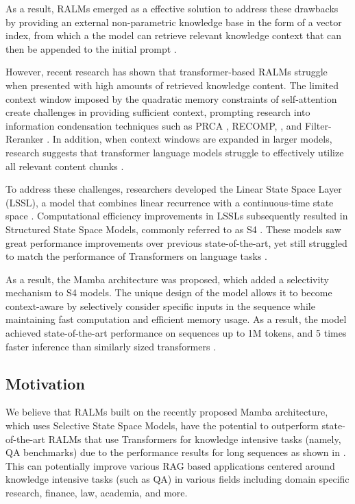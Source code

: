 \documentclass[11pt]{article}
\begin{document}
As a result, RALMs emerged as a effective solution to address these drawbacks by providing an external non-parametric knowledge base in the form of a vector index, from which a the model can retrieve relevant knowledge context that can then be appended to the initial prompt \cite{lewis2021retrievalaugmented}.

However, recent research has shown that transformer-based RALMs struggle when presented with high amounts of retrieved knowledge content. The limited context window imposed by the quadratic memory constraints of self-attention create challenges in providing sufficient context, prompting research into information condensation techniques such as PRCA \cite{yang-etal-2023-prca}, RECOMP, \cite{xu2023recomp}, and Filter-Reranker \cite {ma2023large}. In addition, when context windows are expanded in larger models, research suggests that transformer language models struggle to effectively utilize all relevant content chunks \cite{xu2024retrieval, liu2023lost}. 

To address these challenges, researchers developed the Linear State Space Layer (LSSL), a model that combines linear recurrence with a continuous-time state space \cite{gu2021combining}. Computational efficiency improvements in LSSLs subsequently resulted in Structured State Space Models, commonly referred to as S4 \cite{gu2022}. These models saw great performance improvements over previous state-of-the-art, yet still struggled to match the performance of Transformers on language tasks \cite{gu2023mamba}.

As a result, the Mamba architecture was proposed, which added a selectivity mechanism to S4 models. The unique design of the model allows it to become context-aware by selectively consider specific inputs in the sequence while maintaining fast computation and efficient memory usage. As a result, the model achieved state-of-the-art performance on sequences up to 1M tokens, and 5 times faster inference than similarly sized transformers \cite{gu2023mamba}. 

\subsection{Motivation}
We believe that RALMs built on the recently proposed Mamba architecture, which uses Selective State Space Models, have the potential to outperform state-of-the-art RALMs that use Transformers for knowledge intensive tasks (namely, QA benchmarks) due to the performance results for long sequences as shown in \cite{gu2023mamba, gu2022}. This can potentially improve various RAG based applications centered around knowledge intensive tasks (such as QA) in various fields including domain specific research, finance, law, academia, and more.
    
\end{document}
